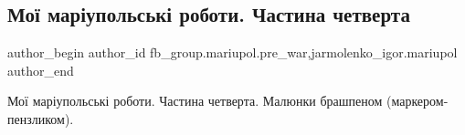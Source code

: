  
 
 
 
 

\subsection{Мої маріупольські роботи. Частина четверта}
\label{sec:23_01_2023.fb.fb_group.mariupol.pre_war.5.mo__mar_upolsk__robo}
 
\ifcmt
 author_begin
   author_id fb_group.mariupol.pre_war,jarmolenko_igor.mariupol
 author_end
\fi

Мої маріупольські роботи. Частина четверта. Малюнки брашпеном (маркером-пензликом).

